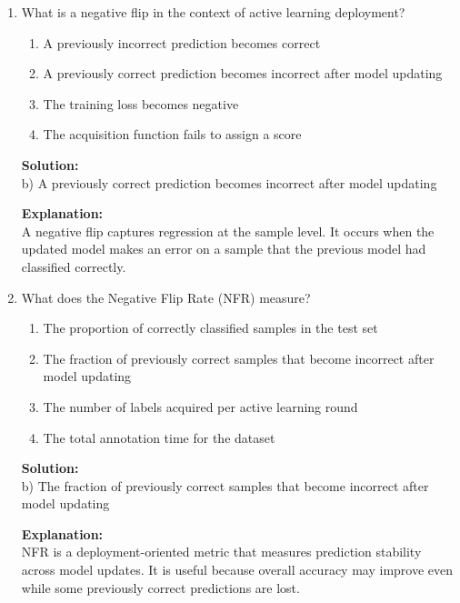 \documentclass{article}
\begin{document}
\begin{enumerate}
\textbf{Explanation:} \\
Fusion-based methods combine the strengths of diversity-based and difficulty-based strategies. This allows the learner to improve global representation early on while refining difficult decision boundaries later.

\vspace{1em}

\item What is a negative flip in the context of active learning deployment?

\begin{enumerate}
    \item A previously incorrect prediction becomes correct
    \item A previously correct prediction becomes incorrect after model updating
    \item The training loss becomes negative
    \item The acquisition function fails to assign a score
\end{enumerate}

\textbf{Solution:} \\
b) A previously correct prediction becomes incorrect after model updating

\textbf{Explanation:} \\
A negative flip captures regression at the sample level. It occurs when the updated model makes an error on a sample that the previous model had classified correctly.

\vspace{1em}

\item What does the Negative Flip Rate (NFR) measure?

\begin{enumerate}
    \item The proportion of correctly classified samples in the test set
    \item The fraction of previously correct samples that become incorrect after model updating
    \item The number of labels acquired per active learning round
    \item The total annotation time for the dataset
\end{enumerate}

\textbf{Solution:} \\
b) The fraction of previously correct samples that become incorrect after model updating

\textbf{Explanation:} \\
NFR is a deployment-oriented metric that measures prediction stability across model updates. It is useful because overall accuracy may improve even while some previously correct predictions are lost.

\end{enumerate}
\end{document}
